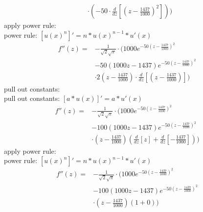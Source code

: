\documentclass[12pt]{article}
\begin{document}
\begin{enumerate}[i.]
\begin{equation}
\begin{aligned}
            & \cdot \left (-50 \cdot \frac{d}{dz} \left [ \left (z-\frac{1437}{1000} \right )^2 \right ] \right ) )
        \end{aligned}
    \end{equation}
    apply power rule: \\
    power rule: $[u(x)^n]' = n*u(x)^{n-1} * u'(x)$ \\
    \begin{equation}
        \begin{aligned}
            f''(z) = {}
            & - \frac{1}{\sqrt{2}\sqrt{\pi}} \cdot (1000e^{-50 \left (z-\frac{1437}{1000} \right )^2} \\
            & -50(1000z - 1437)e^{-50 \left (z-\frac{1437}{1000} \right )^2} \\
            & \cdot 2 \left (z-\frac{1437}{1000} \right ) \cdot \frac{d}{dz} \left [ \left (z-\frac{1437}{1000} \right ) \right ] )
        \end{aligned}
    \end{equation}
    pull out constants: \\
    pull out constants: $[a*u(x)]' = a*u'(x)$ \\
    \begin{equation}
        \begin{aligned}
            f''(z) = {}
            & - \frac{1}{\sqrt{2}\sqrt{\pi}} \cdot (1000e^{-50 \left (z-\frac{1437}{1000} \right )^2} \\
            & -100(1000z - 1437)e^{-50 \left (z-\frac{1437}{1000} \right )^2} \\
            & \cdot \left (z-\frac{1437}{1000} \right ) \left (\frac{d}{dz} \left [ z \right ] + \frac{d}{dz} \left [ - \frac{1437}{1000} \right ]\right ) )
        \end{aligned}
    \end{equation}
    apply power rule: \\
    power rule: $[u(x)^n]' = n*u(x)^{n-1} * u'(x)$ \\
    \begin{equation}
        \begin{aligned}
            f''(z) = {}
            & - \frac{1}{\sqrt{2}\sqrt{\pi}} \cdot (1000e^{-50 \left (z-\frac{1437}{1000} \right )^2} \\
            & -100(1000z - 1437)e^{-50 \left (z-\frac{1437}{1000} \right )^2} \\
            & \cdot \left (z-\frac{1437}{1000} \right ) \left (1+0\right ) )
        \end{aligned}

\end{equation}
\end{enumerate}
\end{document}
